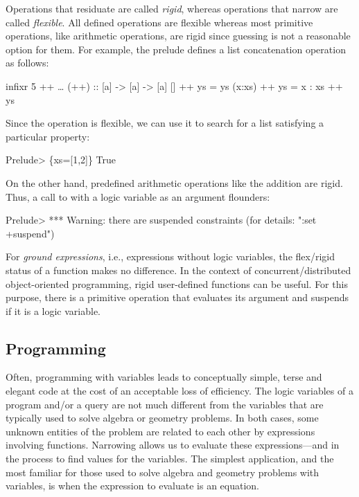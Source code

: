 Operations that residuate are called
\emph{rigid},
whereas operations that narrow are called
\emph{flexible}.
All defined operations are flexible
whereas most primitive operations,
like arithmetic operations, are rigid since guessing is not
a reasonable option for them.
For example, the prelude defines a list concatenation
operation as follows:
%
\begin{prog}
infixr 5 ++
\ldots
(++)          :: [a] -> [a] -> [a]
[]     ++ ys  = ys
(x:xs) ++ ys  = x : xs ++ ys
\end{prog}
%
Since the operation \ccode{++} is flexible, we can use it to search for
a list satisfying a particular property:
%
\begin{prog}
Prelude> 
\{xs=[1,2]\} True
\end{prog}
%
On the other hand, predefined arithmetic operations like the addition \ccode{+}
are rigid. Thus, a call to \ccode{+} with a logic variable as an argument
flounders:
%
\begin{prog}
Prelude> 
*** Warning: there are suspended constraints (for details: ":set +suspend")
\end{prog}
%
For \emph{ground expressions},
i.e., expressions without logic variables, the flex/rigid status of
a function makes no difference.
In the context of concurrent/distributed object-oriented programming,
rigid user-defined functions can be useful.
For this purpose, there is a primitive operation
that evaluates its argument and suspends if it is a logic variable.


\subsection{Programming}

Often, programming with variables leads
to conceptually simple, terse and elegant code
at the cost of an acceptable loss of efficiency.
The logic variables of a program and/or a query
are not much different from the variables that are typically
used to solve algebra or geometry problems.
In both cases, some unknown entities of the problem
are related to each other by expressions involving functions.
Narrowing allows us to evaluate these expressions---and
in the process to find values for the variables.
The simplest application, and the most familiar for
those used to solve algebra and geometry problems with variables,
is when the expression to evaluate is an equation.

